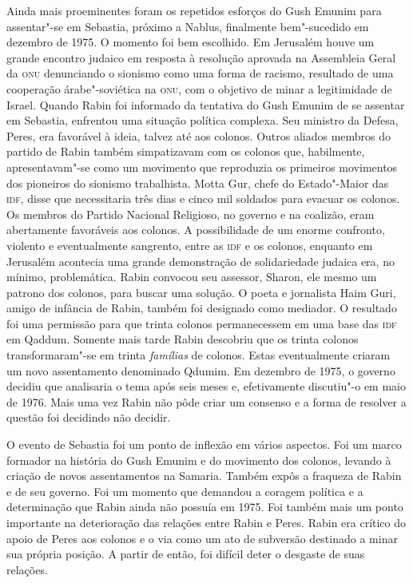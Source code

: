 Ainda mais proeminentes foram os repetidos esforços do Gush Emunim para
assentar"-se em Sebastia, próximo a Nablus, finalmente bem"-sucedido em
dezembro de 1975. O momento foi bem escolhido. Em Jerusalém houve um
grande encontro judaico em resposta à resolução aprovada na Assembleia
Geral da \textsc{onu} denunciando o sionismo como uma forma de racismo, resultado
de uma cooperação árabe"-soviética na \textsc{onu}, com o objetivo de minar a
legitimidade de Israel. Quando Rabin foi informado da tentativa do Gush
Emunim de se assentar em Sebastia, enfrentou uma situação política
complexa. Seu ministro da Defesa, Peres, era favorável à ideia, talvez
até aos colonos. Outros aliados membros do partido de Rabin também
simpatizavam com os colonos que, habilmente, apresentavam"-se como um
movimento que reproduzia os primeiros movimentos dos pioneiros do
sionismo trabalhista. Motta Gur, chefe do Estado"-Maior das \textsc{idf}, disse
que necessitaria três dias e cinco mil soldados para evacuar os colonos.
Os membros do Partido Nacional Religioso, no governo e na coalizão, eram
abertamente favoráveis aos colonos. A possibilidade de um enorme
confronto, violento e eventualmente sangrento, entre as \textsc{idf} e os
colonos, enquanto em Jerusalém acontecia uma grande demonstração de
solidariedade judaica era, no mínimo, problemática. Rabin convocou seu
assessor, Sharon, ele mesmo um patrono dos colonos, para buscar uma
solução. O poeta e jornalista Haim Guri, amigo de infância de Rabin,
também foi designado como mediador. O resultado foi uma
permissão para que trinta colonos permanecessem em uma base das \textsc{idf} em
Qaddum. Somente mais tarde Rabin descobriu que os trinta colonos
transformaram"-se em trinta \textit{famílias} de colonos. Estas
eventualmente criaram um novo assentamento denominado Qdumim. Em
dezembro de 1975, o governo decidiu que analisaria o tema após seis meses
e, efetivamente discutiu"-o em maio de 1976. Mais uma vez Rabin não pôde
criar um consenso e a forma de resolver a questão foi decidindo não
decidir.

O evento de Sebastia foi um ponto de inflexão em vários aspectos. Foi um
marco formador na história do Gush Emunim e do movimento dos colonos,
levando à criação de novos assentamentos na Samaria. Também expôs a
fraqueza de Rabin e de seu governo. Foi um momento que demandou a
coragem política e a determinação que Rabin ainda não possuía em 1975.
Foi também mais um ponto importante na deterioração das relações entre
Rabin e Peres. Rabin era crítico do apoio de Peres aos colonos e o via
como um ato de subversão destinado a minar sua própria posição. A partir
de então, foi difícil deter o desgaste de suas relações.

